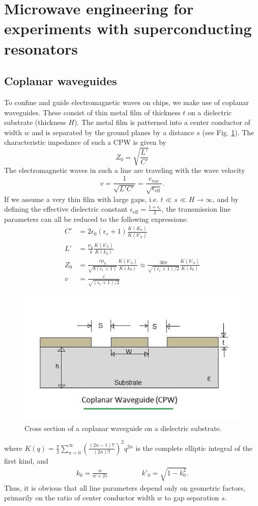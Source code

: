 \section{Microwave engineering for experiments with superconducting resonators}


\subsection{Coplanar waveguides}
To confine and guide electromagnetic waves on chips, we make use of coplanar waveguides.
These consist of thin metal film of thickness $t$ on a dielectric substrate (thickness $H$).
The metal film is patterned into a center conductor of width $w$ and is separated by the ground planes by a distance $s$ (see Fig. \ref{fig:cpw-coplanar-waveguide}).
The characteristic impedance of such a CPW is given by
\begin{equation}
Z_0 = \sqrt{\frac{L'}{C'}}
\end{equation}
The electromagnetic waves in such a line are traveling with the wave velocity \begin{equation}
v=\frac{1}{\sqrt{L'C'}}=\frac{c_\text{vac}}{\sqrt{\epsilon_\text{eff}}}.
\end{equation}
If we assume a very thin film with large gaps, i.e. $t \ll s \ll H \rightarrow \infty$, and by defining the effective dielectric constant $\epsilon_\text{eff} = \frac{1+\epsilon_r}{2}$, the transmission line parameters can all be reduced to the following expressions:
\begin{align}
C' &= 2\epsilon_0(\epsilon_r+1)\frac{K(K_0)}{K(k'_0)} \\%
L' &= \frac{\mu_0}{4}\frac{K(k'_0)}{K(k_0)} \\%
Z_0 &= \frac{c\mu_0}{\sqrt{8(\epsilon_r+1)}}\frac{K(k'_0)}{K(k_0)}\approx \frac{30\pi}{\sqrt{(\epsilon_r+1)/2}}\frac{K(k'_0)}{K(k_0)} \\%
v &= \frac{c}{\sqrt{(\epsilon_r+1)/2}}
\end{align}
\begin{figure}
	\centering
	\includegraphics[width=0.3\linewidth]{chapter-theory/figs-RF/CPW-Coplanar-Waveguide.jpg}
	\caption{Cross section of a coplanar waveguide on a dielectric substrate.}
	\label{fig:cpw-coplanar-waveguide}
\end{figure}
where $K(q) = \frac{\pi}{2}\sum_{n=0}^{\infty}\left(\frac{(2n-1)!!}{(2n)!!}\right)^2 q^{2n}$ is the complete elliptic integral of the first kind, and
\begin{align}
k_0 = \frac{w}{w+2s} \hspace{2cm} k'_0 = \sqrt{1-k_0^2}.
\end{align}
Thus, it is obvious that all line parameters depend only on geometric factors, primarily on the ratio of center conductor width $w$ to gap separation $s$.



